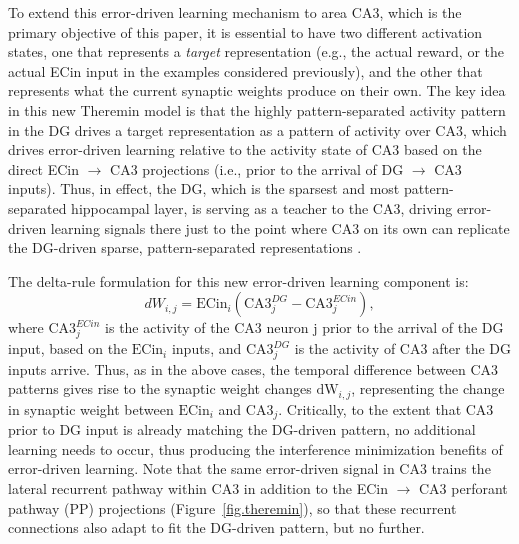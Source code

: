 \documentclass[11pt,twoside]{article}
\newif\myifpdf
\begin{document}
To extend this error-driven learning mechanism to area CA3, which is the primary objective of this paper, it is essential to have two different activation states, one that represents a \emph{target} representation (e.g., the actual reward, or the actual ECin input in the examples considered previously), and the other that represents what the current synaptic weights produce on their own.  The key idea in this new Theremin model is that the highly pattern-separated activity pattern in the DG drives a target representation as a pattern of activity over CA3, which drives error-driven learning relative to the activity state of CA3 based on the direct ECin $\rightarrow$ CA3 projections (i.e., prior to the arrival of DG $\rightarrow$ CA3 inputs).  Thus, in effect, the DG, which is the sparsest and most pattern-separated hippocampal layer, is serving as a teacher to the CA3, driving error-driven learning signals there just to the point where CA3 on its own can replicate the DG-driven sparse, pattern-separated representations \citep{KowadloAhmedRawlinson20}.

The delta-rule formulation for this new error-driven learning component is:
\begin{equation}
\label{eq.CA3EDL}
    dW_{i,j} = \mbox{ECin}_i (\mbox{CA3}_j^{DG} - \mbox{CA3}_j^{ECin} ) ,
\end{equation}
where $\mbox{CA3}_j^{ECin}$ is the activity of the CA3 neuron $\mbox{j}$ prior to the arrival of the DG input, based on the $\mbox{ECin}_i$ inputs, and $\mbox{CA3}_j^{DG}$ is the activity of CA3 after the DG inputs arrive. Thus, as in the above cases, the temporal difference between CA3 patterns gives rise to the synaptic weight changes $\mbox{dW}_{i,j}$, representing the change in synaptic weight between $\mbox{ECin}_i$ and $\mbox{CA3}_j$.  Critically, to the extent that CA3 prior to DG input is already matching the DG-driven pattern, no additional learning needs to occur, thus producing the interference minimization benefits of error-driven learning.  Note that the same error-driven signal in CA3 trains the lateral recurrent pathway within CA3 in addition to the ECin $\rightarrow$ CA3 perforant pathway (PP) projections (Figure~\ref{fig.theremin}), so that these recurrent connections also adapt to fit the DG-driven pattern, but no further.
\end{document}
